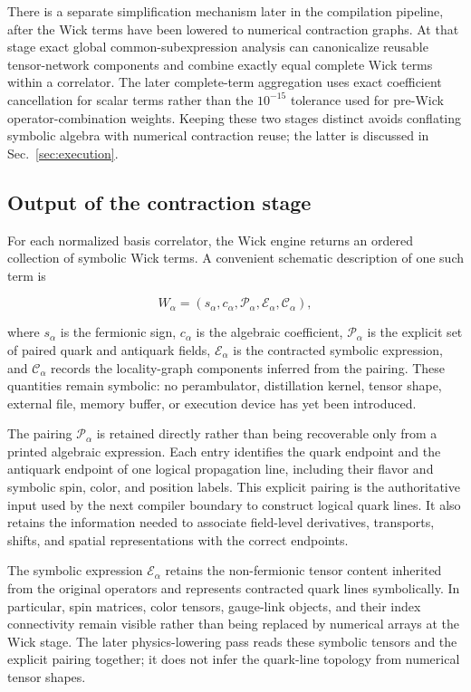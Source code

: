\documentclass[11pt]{article}
\begin{document}
There is a separate simplification mechanism later in the compilation pipeline,
after the Wick terms have been lowered to numerical contraction graphs. At that
stage exact global common-subexpression analysis can canonicalize reusable
tensor-network components and combine exactly equal complete Wick terms within
a correlator. The later complete-term aggregation uses exact coefficient
cancellation for scalar terms rather than the \(10^{-15}\) tolerance used for
pre-Wick operator-combination weights. Keeping these two stages distinct avoids
conflating symbolic algebra with numerical contraction reuse; the latter is
discussed in Sec.~\ref{sec:execution}.

\subsection{Output of the contraction stage}

For each normalized basis correlator, the Wick engine returns an ordered
collection of symbolic Wick terms. A convenient schematic description of one
such term is

\begin{equation}
W_\alpha
=
\left(
 s_\alpha,
 c_\alpha,
 \mathcal P_\alpha,
 \mathcal E_\alpha,
 \mathcal C_\alpha
\right),
\label{eq:wick_term_contents}
\end{equation}

where \(s_\alpha\) is the fermionic sign, \(c_\alpha\) is the algebraic
coefficient, \(\mathcal P_\alpha\) is the explicit set of paired quark and
antiquark fields, \(\mathcal E_\alpha\) is the contracted symbolic expression,
and \(\mathcal C_\alpha\) records the locality-graph components inferred from
the pairing. These quantities remain symbolic: no perambulator, distillation
kernel, tensor shape, external file, memory buffer, or execution device has yet
been introduced.

The pairing \(\mathcal P_\alpha\) is retained directly rather than being
recoverable only from a printed algebraic expression. Each entry identifies the
quark endpoint and the antiquark endpoint of one logical propagation line,
including their flavor and symbolic spin, color, and position labels. This
explicit pairing is the authoritative input used by the next compiler boundary
to construct logical quark lines. It also retains the information needed to
associate field-level derivatives, transports, shifts, and spatial
representations with the correct endpoints.

The symbolic expression \(\mathcal E_\alpha\) retains the non-fermionic tensor
content inherited from the original operators and represents contracted quark
lines symbolically. In particular, spin matrices, color tensors, gauge-link
objects, and their index connectivity remain visible rather than being replaced
by numerical arrays at the Wick stage. The later physics-lowering pass reads
these symbolic tensors and the explicit pairing together; it does not infer the
quark-line topology from numerical tensor shapes.
\end{document}
